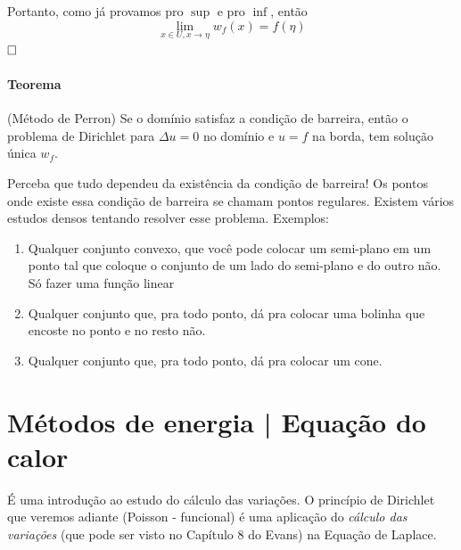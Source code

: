 \documentclass[11pt]{article}
\newcommand{\qed}{$\hfill\square$}
\begin{document}
Portanto, como já provamos pro \(\sup\) e pro \(\inf\), então \[\lim_{x \in U, x \rightarrow \eta}  w_f(x) = f(\eta)\]\qed

\paragraph{Teorema}(Método de Perron) Se o domínio satisfaz a condição de barreira, então o problema de Dirichlet para \(\Delta u =0\) no domínio e \(u=f\) na borda, tem solução única \(w_f\).

Perceba que tudo dependeu da existência da condição de barreira! Os pontos onde existe essa condição de barreira se chamam pontos regulares. Existem vários estudos densos tentando resolver esse problema. Exemplos:

\begin{enumerate}
	\item Qualquer conjunto convexo, que você pode colocar um semi-plano em um ponto tal que coloque o conjunto de um lado do semi-plano e do outro não. Só fazer uma função linear
	\item Qualquer conjunto que, pra todo ponto, dá pra colocar uma bolinha que encoste no ponto e no resto não.
	\item Qualquer conjunto que, pra todo ponto, dá pra colocar um cone.
\end{enumerate}





































\section{Métodos de energia | Equação do calor}
É uma introdução ao estudo do cálculo das variações. O princípio de Dirichlet que veremos adiante (Poisson - funcional) é uma aplicação do \textit{cálculo das variações} (que pode ser visto no Capítulo 8 do Evans) na Equação de Laplace.
\end{document}
